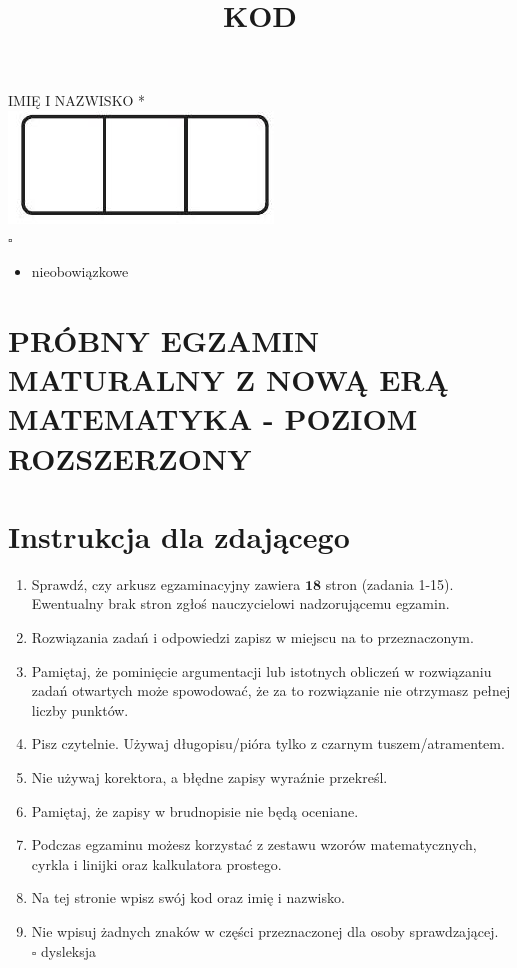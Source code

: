 \documentclass[10pt]{article}
\title{KOD }
\author{}
\date{}
\begin{document}
\maketitle
IMIĘ I NAZWISKO *\\
\includegraphics[max width=\textwidth, center]{2024_11_21_a7a52c0c0974ad42b88bg-01}\\
\(\square\)

\begin{itemize}
  \item nieobowiązkowe
\end{itemize}

\section*{PRÓBNY EGZAMIN MATURALNY Z NOWĄ ERĄ MATEMATYKA - POZIOM ROZSZERZONY}
\section*{Instrukcja dla zdającego}
\begin{enumerate}
  \item Sprawdź, czy arkusz egzaminacyjny zawiera \(\mathbf{1 8}\) stron (zadania 1-15). Ewentualny brak stron zgłoś nauczycielowi nadzorującemu egzamin.
  \item Rozwiązania zadań i odpowiedzi zapisz w miejscu na to przeznaczonym.
  \item Pamiętaj, że pominięcie argumentacji lub istotnych obliczeń w rozwiązaniu zadań otwartych może spowodować, że za to rozwiązanie nie otrzymasz pełnej liczby punktów.
  \item Pisz czytelnie. Używaj długopisu/pióra tylko z czarnym tuszem/atramentem.
  \item Nie używaj korektora, a błędne zapisy wyraźnie przekreśl.
  \item Pamiętaj, że zapisy w brudnopisie nie będą oceniane.
  \item Podczas egzaminu możesz korzystać z zestawu wzorów matematycznych, cyrkla i linijki oraz kalkulatora prostego.
  \item Na tej stronie wpisz swój kod oraz imię i nazwisko.
  \item Nie wpisuj żadnych znaków w części przeznaczonej dla osoby sprawdzającej.\\
\(\square\) dysleksja
\end{enumerate}
\end{document}
